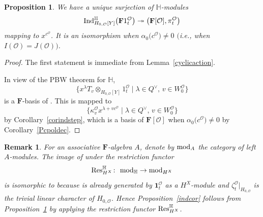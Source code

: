 \documentclass[pdftex]{sigma}
\numberwithin{equation}{section}
\newtheorem{Proposition}[Theorem]{Proposition}
\newtheorem{Remark}[Theorem]{Remark} }
\begin{document}
\begin{Proposition}\label{indform}
We have a unique surjection of $\mathbb{H}$-modules
\begin{equation*}%
{\rm Ind}_{H_{0,\mathcal{O}}[Y]}^{\mathbb{H}}\bigl(\mathbf{F}1_t^\mathcal{O}\bigr)\twoheadrightarrow \bigl(\mathbf{F}[\mathcal{O}],\pi_t^\mathcal{O}\bigr)
\end{equation*}
mapping  to $x^{c^{\mathcal{O}}}$. It is an isomorphism when $\alpha_0\bigl(c^\mathcal{O}\bigr)\not=0$ $($i.e., when $I(\mathcal{O})=J(\mathcal{O}))$.
\end{Proposition}
\begin{proof}
The first statement is immediate from Lemma~\ref{cyclicaction}.

In view of the PBW theorem for $\mathbb{H}$,
\[
\bigl\{x^\lambda T_v\otimes_{H_{0,\mathcal{O}}[Y]}1_t^\mathcal{O}
\mid \lambda\in Q^\vee,\, v\in W_0^\mathcal{O}\bigr\}
\]
is a $\mathbf{F}$-basis of . This
is mapped to
\[
\bigl\{\kappa_v^\mathcal{O}x^{\lambda+vc^\mathcal{O}} \mid \lambda\in Q^\vee,\, v\in W_0^\mathcal{O}\bigr\}
\]
by Corollary~\ref{corindstep}, which is
a basis of $\mathbf{F}[\mathcal{O}]$ when $\alpha_0\bigl(c^\mathcal{O}\bigr)\not=0$
by Corollary~\ref{Pcpoldec}.
\end{proof}

\begin{Remark}
For an associative $\mathbf{F}$-algebra $A$, denote by ${\rm mod}_A$ the category of left $A$-modules. The image of
 under the
restriction functor
\[
\textup{Res}_{H^X}^{\mathbb{H}}\colon\ {\rm mod}_{\mathbb{H}}\rightarrow{\rm mod}_{H^X}
\]
is isomorphic to  because  is already generated by $\mathbf{1}_t^\mathcal{O}$ as
a $H^X$-module and
 $\zeta_t^\mathcal{O}\vert_{H_{0,\mathcal{O}}}$ is the trivial linear character of $H_{0,\mathcal{O}}$. Hence Proposition~\ref{indcor} follows from
 Proposition~\ref{indform} by applying the restriction functor $\textup{Res}_{H^X}^{\mathbb{H}}$.
\end{Remark}
\end{document}
